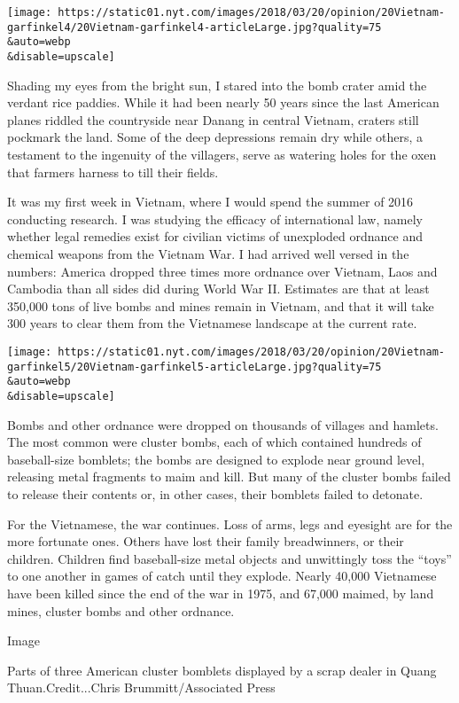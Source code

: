 \texttt{[image: https://static01.nyt.com/images/2018/03/20/opinion/20Vietnam-garfinkel4/20Vietnam-garfinkel4-articleLarge.jpg?quality=75\\\&auto=webp\\\&disable=upscale]}

Shading my eyes from the bright sun, I stared into the bomb crater amid
the verdant rice paddies. While it had been nearly 50 years since the
last American planes riddled the countryside near Danang in central
Vietnam, craters still pockmark the land. Some of the deep depressions
remain dry while others, a testament to the ingenuity of the villagers,
serve as watering holes for the oxen that farmers harness to till their
fields.

It was my first week in Vietnam, where I would spend the summer of 2016
conducting research. I was studying the efficacy of international law,
namely whether legal remedies exist for civilian victims of unexploded
ordnance and chemical weapons from the Vietnam War. I had arrived well
versed in the numbers: America dropped three times more ordnance over
Vietnam, Laos and Cambodia than all sides did during World War II.
Estimates are that at least 350,000 tons of live bombs and mines remain
in Vietnam, and that it will take 300 years to clear them from the
Vietnamese landscape at the current rate.

\texttt{[image: https://static01.nyt.com/images/2018/03/20/opinion/20Vietnam-garfinkel5/20Vietnam-garfinkel5-articleLarge.jpg?quality=75\\\&auto=webp\\\&disable=upscale]}

Bombs and other ordnance were dropped on thousands of villages and
hamlets. The most common were cluster bombs, each of which contained
hundreds of baseball-size bomblets; the bombs are designed to explode
near ground level, releasing metal fragments to maim and kill. But many
of the cluster bombs failed to release their contents or, in other
cases, their bomblets failed to detonate.

For the Vietnamese, the war continues. Loss of arms, legs and eyesight
are for the more fortunate ones. Others have lost their family
breadwinners, or their children. Children find baseball-size metal
objects and unwittingly toss the ``toys'' to one another in games of
catch until they explode. Nearly 40,000 Vietnamese have been killed
since the end of the war in 1975, and 67,000 maimed, by land mines,
cluster bombs and other ordnance.

Image

Parts of three American cluster bomblets displayed by a scrap dealer in
Quang Thuan.Credit...Chris Brummitt/Associated Press

